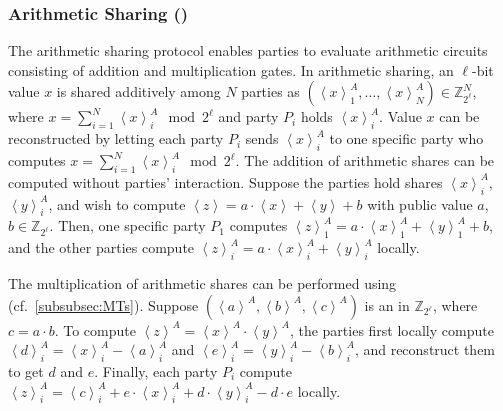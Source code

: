 \subsubsection{Arithmetic Sharing (\ARITH)}
\label{subsubsec:ArithmeticSharing}
The arithmetic sharing protocol enables parties to evaluate arithmetic circuits consisting of addition and multiplication gates.
In arithmetic sharing, an $\ell$-bit value $x$ is shared additively among $N$ parties as $\left(\left\langle x\right\rangle ^A_1, \ldots,\left\langle x\right\rangle ^A_N \right) \in \mathbb{Z} ^N_{2^{\ell}}$, where $x=\sum_{i=1}^{N} \left\langle x\right\rangle^A_i \mod{2^{\ell}} $ and party $P_i$ holds $\left\langle x\right\rangle^A_i $. Value $x$ can be reconstructed by letting each party $P_i$ sends $\left\langle x\right\rangle^A_i $ to one specific party who computes $x=\sum_{i=1}^{N} \left\langle x\right\rangle^A_i \mod{2^{\ell}}$.
The addition of arithmetic shares can be computed without parties' interaction. Suppose the parties hold shares $\left\langle x\right\rangle^A_i $, $\left\langle y\right\rangle^A_i $, and wish to compute $\left\langle z\right\rangle =a \cdot \left\langle x\right\rangle +\left\langle y\right\rangle +b$ with public value $a$, $b\in \mathbb{Z} _{2^{\ell}}$. Then, one specific party $P_1$ computes $\left\langle z\right\rangle ^A_1=a \cdot \left\langle x\right\rangle^A_1 +\left\langle y\right\rangle^A_1 +b$, and the other parties compute $ \left\langle z\right\rangle ^A_i=a \cdot \left\langle x\right\rangle^A_i +\left\langle y\right\rangle^A_i $ locally.

The multiplication of arithmetic shares can be performed using \mts (cf.~\autoref{subsubsec:MTs}). Suppose $\left(\left\langle a\right\rangle^A ,\left\langle b\right\rangle^A,\left\langle c\right\rangle^A\right) $ is an \mts in $\mathbb{Z} _{2^{\ell}}$, where $c =a \cdot b $. To compute $\left\langle z\right\rangle ^A = \left\langle x\right\rangle ^A \cdot \left\langle y\right\rangle ^A$, the parties first locally compute $\left\langle d\right\rangle ^A_i=\left\langle x\right\rangle ^A_i-\left\langle a\right\rangle^A_i $ and $\left\langle e\right\rangle ^A_i=\left\langle y\right\rangle ^A_i-\left\langle b\right\rangle ^A_i$, and reconstruct them to get $d$ and $e$. Finally, each party $P_i$ compute $\left\langle z\right\rangle ^A_i = \left\langle c\right\rangle ^A_i+e \cdot \left\langle x\right\rangle_i ^A+d \cdot \left\langle y\right\rangle_i ^A- d \cdot e$ locally.

